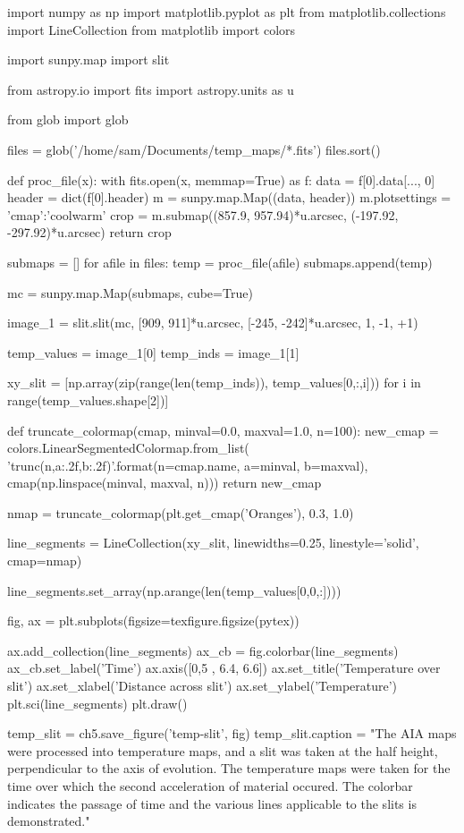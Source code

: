 \begin{pycode}[chapter5]
import numpy as np
import matplotlib.pyplot as plt
from matplotlib.collections import LineCollection
from matplotlib import colors

import sunpy.map
import slit 

from astropy.io import fits
import astropy.units as u

from glob import glob

files = glob('/home/sam/Documents/temp_maps/*.fits')
files.sort()

def proc_file(x):
    with fits.open(x, memmap=True) as f:
        data = f[0].data[..., 0]
        header = dict(f[0].header)
        m = sunpy.map.Map((data, header))
        m.plotsettings = {'cmap':'coolwarm'}
        crop = m.submap((857.9, 957.94)*u.arcsec,
                 (-197.92, -297.92)*u.arcsec)
    return crop 


submaps = []
for afile in files:
    temp = proc_file(afile)
    submaps.append(temp)

mc = sunpy.map.Map(submaps, cube=True)


image_1 = slit.slit(mc, [909, 911]*u.arcsec, [-245, -242]*u.arcsec, 1, -1, +1)

temp_values = image_1[0]
temp_inds = image_1[1]


xy_slit = [np.array(zip(range(len(temp_inds)), temp_values[0,:,i])) for i in range(temp_values.shape[2])]

def truncate_colormap(cmap, minval=0.0, maxval=1.0, n=100):
    new_cmap = colors.LinearSegmentedColormap.from_list(
        'trunc({n},{a:.2f},{b:.2f})'.format(n=cmap.name, a=minval, b=maxval),
        cmap(np.linspace(minval, maxval, n)))
    return new_cmap

nmap = truncate_colormap(plt.get_cmap('Oranges'), 0.3, 1.0)

line_segments = LineCollection(xy_slit,
                               linewidths=0.25,
                               linestyle='solid',
                               cmap=nmap)

line_segments.set_array(np.arange(len(temp_values[0,0,:])))

fig, ax = plt.subplots(figsize=texfigure.figsize(pytex))


ax.add_collection(line_segments)
ax_cb = fig.colorbar(line_segments)
ax_cb.set_label('Time')
ax.axis([0,5 , 6.4, 6.6])
ax.set_title('Temperature over slit')
ax.set_xlabel('Distance across slit')
ax.set_ylabel('Temperature')
plt.sci(line_segments)
plt.draw()

temp_slit = ch5.save_figure('temp-slit', fig)
temp_slit.caption = "The AIA maps were processed into temperature maps, and a slit was taken at the half height, perpendicular to the axis of evolution. The temperature maps were taken for the time over which the second acceleration of material occured. The colorbar indicates the passage of time and the various lines applicable to the slits is demonstrated."


\end{pycode}

